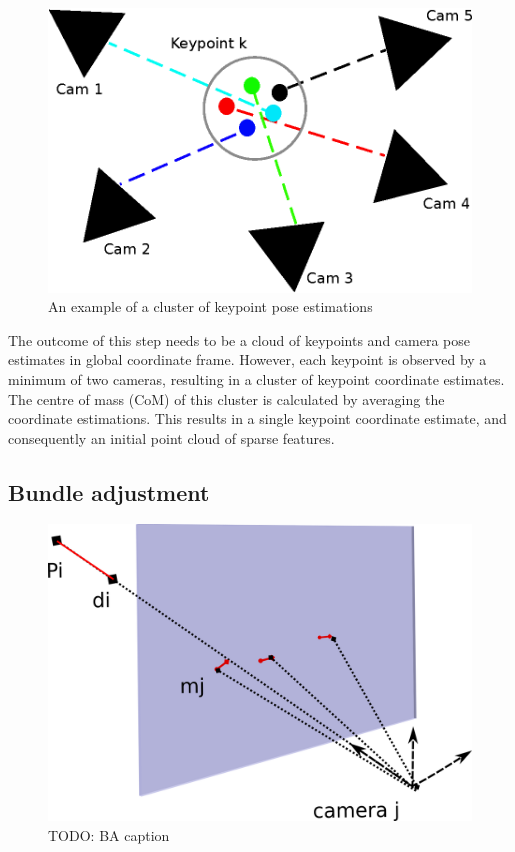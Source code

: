 \documentclass[10pt,twocolumn,letterpaper]{article}
\begin{document}
\begin{figure}[t]
\begin{center}
   \includegraphics[width=0.9\linewidth]{figures/clusters.eps}
\end{center}
\caption{An example of a cluster of keypoint pose estimations}
\label{fig:spanning}
\end{figure}

The outcome of this step needs to be a cloud of keypoints and camera pose
estimates in global coordinate frame. However, each keypoint is observed by a
minimum of two cameras, resulting in a cluster of keypoint coordinate estimates.
The centre of mass (CoM) of this cluster is calculated by averaging the
coordinate estimations. This results in a single keypoint coordinate estimate,
and consequently an initial point cloud of sparse features.


\subsection{Bundle adjustment}

\begin{figure}[t]
\begin{center}
   \includegraphics[width=0.9\linewidth]{figures/ba.pdf}
\end{center}
\caption{TODO: BA caption}
\label{fig:spanning}
\end{figure}
\end{document}
